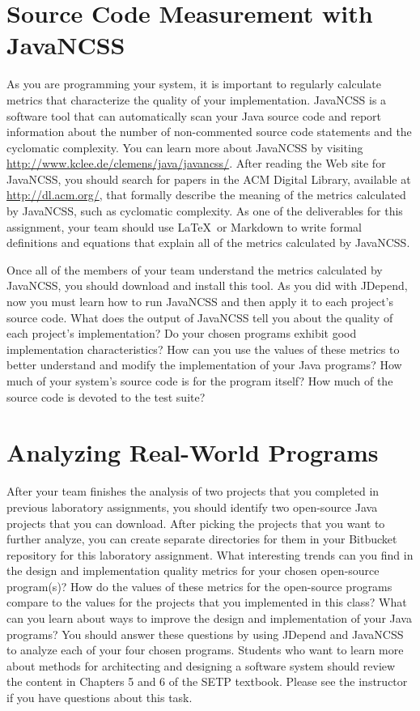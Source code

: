 \section*{Source Code Measurement with JavaNCSS}

As you are programming your system, it is important to regularly calculate metrics that characterize the quality of your
implementation.  JavaNCSS is a software tool that can automatically scan your Java source code and report information
about the number of non-commented source code statements and the cyclomatic complexity.  You can learn more about
JavaNCSS by visiting \url{http://www.kclee.de/clemens/java/javancss/}. After reading the Web site for JavaNCSS, you
should search for papers in the ACM Digital Library, available at \url{http://dl.acm.org/}, that formally describe the
meaning of the metrics calculated by JavaNCSS, such as cyclomatic complexity. As one of the deliverables for this
assignment, your team should use \LaTeX\ or Markdown to write formal definitions and equations that explain all of the
metrics calculated by JavaNCSS.

Once all of the members of your team understand the metrics calculated by JavaNCSS, you should download and install this
tool.  As you did with JDepend, now you must learn how to run JavaNCSS and then apply it to each project's source code.
What does the output of JavaNCSS tell you about the quality of each project's implementation? Do your chosen programs
exhibit good implementation characteristics? How can you use the values of these metrics to better understand and modify
the implementation of your Java programs? How much of your system's source code is for the program itself? How much of
the source code is devoted to the test suite?

\section*{Analyzing Real-World Programs}

After your team finishes the analysis of two projects that you completed in previous laboratory assignments, you should
identify two open-source Java projects that you can download.  After picking the projects that you want to further
analyze, you can create separate directories for them in your Bitbucket repository for this laboratory assignment.  What
interesting trends can you find in the design and implementation quality metrics for your chosen open-source program(s)?
How do the values of these metrics for the open-source programs compare to the values for the projects that you
implemented in this class?  What can you learn about ways to improve the design and implementation of your Java
programs? You should answer these questions by using JDepend and JavaNCSS to analyze each of your four chosen programs.
Students who want to learn more about methods for architecting and designing a software system should review the content
in Chapters 5 and 6 of the SETP textbook. Please see the instructor if you have questions about this task.

